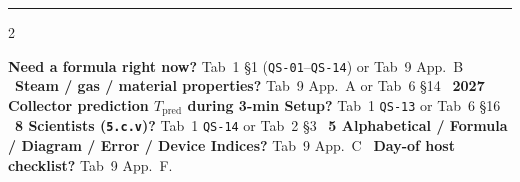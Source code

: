\clearpage
\thispagestyle{plain}
\par
\vspace{2pt}\textcolor{navy}{\rule{\linewidth}{1.0pt}}\par\vspace{2pt}
{\footnotesize\sloppy
\begin{multicols}{2}
\makeatletter
{}
\makeatother
\end{multicols}}
\vfill
\begin{shortcut}
\footnotesize
\textbf{Need a formula right now?} Tab~1 \S1 (\texttt{QS-01}--\texttt{QS-14}) or Tab~9 App.~B \textperiodcentered\
\textbf{Steam / gas / material properties?} Tab~9 App.~A or Tab~6 \S14 \textperiodcentered\
\textbf{2027 Collector prediction $T_{\mathrm{pred}}$ during 3-min Setup?} Tab~1 \texttt{QS-13} or Tab~6 \S16 \textperiodcentered\
\textbf{8 Scientists (\texttt{5.c.v})?} Tab~1 \texttt{QS-14} or Tab~2 \S3 \textperiodcentered\
\textbf{5 Alphabetical / Formula / Diagram / Error / Device Indices?} Tab~9 App.~C \textperiodcentered\
\textbf{Day-of host checklist?} Tab~9 App.~F.
\end{shortcut}
\clearpage
